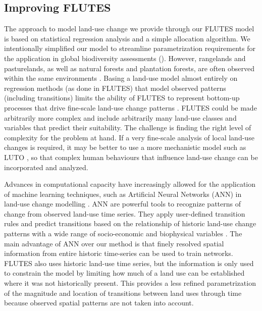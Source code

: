 \documentclass[titlesmallcaps,copyrightpage]{uomthesis}\usepackage[]{graphicx}\usepackage[]{color}
\begin{document}
\subsection{Improving FLUTES}

The approach to model land-use change we provide through our FLUTES model is based on statistical regression analysis and a simple allocation algorithm. We intentionally simplified our model to streamline parametrization requirements for the application in global biodiversity assessments (). However, rangelands and pasturelands, as well as natural forests and plantation forests, are often observed within the same environments \citep[for example, semi-arid rangelands and pasturelands on the Australian continent, or natural forests and plantations in tropical regions, see][]{newbold_reply_2019}. Basing a land-use model almost entirely on regression methods (as done in FLUTES) that model observed patterns (including transitions) limits the ability of FLUTES to represent bottom-up processes that drive fine-scale land-use change patterns \citep{noszczyk_review_2019}. FLUTES could be made arbitrarily more complex and include arbitrarily many land-use classes and variables that predict their suitability. The challenge is finding the right level of complexity for the problem at hand. If a very fine-scale analysis of local land-use changes is required, it may be better to use a more mechanistic model such as LUTO \citep{bryan_supply_2014}, so that complex human behaviours that influence land-use change can be incorporated and analyzed.

Advances in computational capacity have increasingly allowed for the application of machine learning techniques, such as Artificial Neural Networks (ANN) in land-use change modelling \citep{noszczyk_review_2019, koomen_core_2011}. ANN are powerful tools to recognize patterns of change from observed land-use time series. They apply user-defined transition rules and predict transitions based on the relationship of historic land-use change patterns with a wide range of socio-economic and biophysical variables \citep{pijanowski_using_2002}.  The main advantage of ANN over our method is that finely resolved spatial information from entire historic time-series can be used to train networks. FLUTES also uses historic land-use time series, but the information is only used to constrain the model by limiting how much of a land use can be established where it was not historically present. This provides a less refined parametrization of the magnitude and location of transitions between land uses through time because observed spatial patterns are not taken into account.
\end{document}

